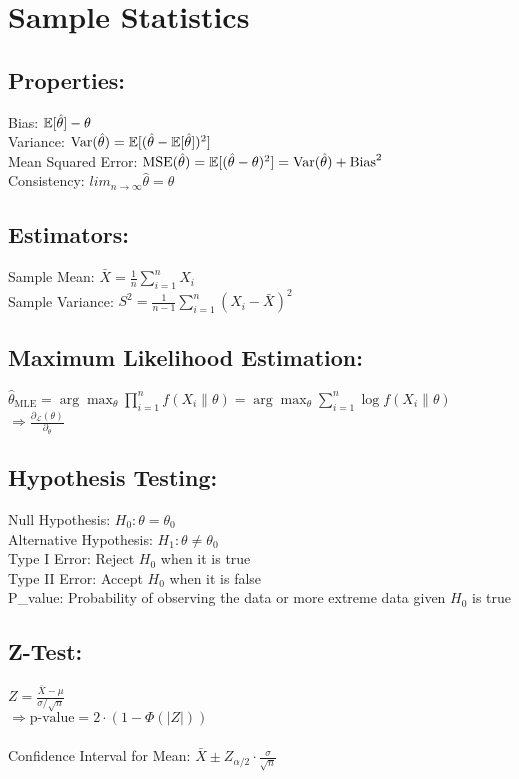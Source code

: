 \section{Sample Statistics}
\subsection{Properties:}
Bias: $\mathbb{E}[\hat{\theta}] - \theta$\\
Variance: $\text{Var}(\hat{\theta}) = \mathbb{E}[(\hat{\theta} - \mathbb{E}[\hat{\theta}])^2]$\\
Mean Squared Error: $\text{MSE}(\hat{\theta}) = \mathbb{E}[(\hat{\theta} - \theta)^2] = 
\text{Var}(\hat{\theta}) + \text{Bias}^2$\\
Consistency: $lim_{n \to \infty} \hat{\theta} = \theta$\\
\subsection{Estimators:}
Sample Mean: $\bar{X} = \frac{1}{n} \sum_{i=1}^{n} X_i$\\
Sample Variance: $S^2 = \frac{1}{n-1} \sum_{i=1}^{n} (X_i - \bar{X})^2$\\
\subsection{Maximum Likelihood Estimation:}
$\hat{\theta}_{\text{MLE}} = \arg \max_{\theta} \prod_{i=1}^{n} f(X_i \| \theta) = \arg \max_{\theta} \sum_{i=1}^{n} \log f(X_i \| \theta)$\\
$\Rightarrow \frac{\partial_{\mathcal{L}}(\theta)}{\partial_\theta}$

\subsection{Hypothesis Testing:}
Null Hypothesis: $H_0: \theta = \theta_0$\\
Alternative Hypothesis: $H_1: \theta \neq \theta_0$\\
Type I Error: Reject $H_0$ when it is true\\
Type II Error: Accept $H_0$ when it is false\\
P\_value: Probability of observing the data or more extreme data given $H_0$ is true\\
\subsection{Z-Test:}
$Z = \frac{\bar{X} - \mu}{\sigma / \sqrt{n}}$\\
$\Rightarrow \text{p-value} = 2 \cdot (1 - \Phi(|Z|))$\\ \\
Confidence Interval for Mean: $\bar{X} \pm Z_{\alpha/2} \cdot \frac{\sigma}{\sqrt{n}}$\\

